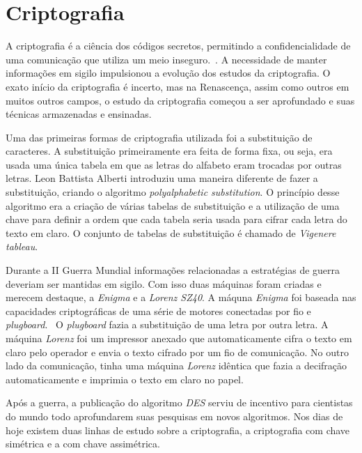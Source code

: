 \chapter{Criptografia}
\label{cryptograhy}

%
A criptografia é a ciência dos códigos secretos, permitindo a confidencialidade de uma comunicação que utiliza um meio inseguro.~\cite{vauldenay}. A necessidade de manter informações em sigilo impulsionou a evolução dos estudos da criptografia. O exato início da criptografia é incerto, mas na Renascença, assim como outros em muitos outros campos, o estudo da criptografia começou a ser aprofundado e suas técnicas armazenadas e ensinadas. \cite{donald-davies}

%
Uma das primeiras formas de criptografia utilizada foi a substituição de caracteres. A substituição primeiramente era feita de forma fixa, ou seja, era usada uma única tabela em que as letras do alfabeto eram trocadas por outras letras. Leon Battista Alberti introduziu uma maneira diferente de fazer a substituição, criando o algoritmo \textit{polyalphabetic substitution}. O princípio desse algoritmo era a criação de várias tabelas de substituição e a utilização de uma chave para definir a ordem que cada tabela seria usada para cifrar cada letra do texto em claro. O conjunto de tabelas de substituição é chamado de \textit{Vigenere tableau}.

%
Durante a II Guerra Mundial informações relacionadas a estratégias de guerra deveriam ser mantidas em sigilo. Com isso duas máquinas foram criadas e merecem destaque, a \textit{Enigma} e a \textit{Lorenz SZ40}. A máquna \textit{Enigma} foi baseada nas capacidades criptográficas de uma série de motores conectadas por fio e \textit{plugboard}.~\cite{jennifer-wilcox} O \textit{plugboard} fazia a substituição de uma letra por outra letra. A máquina \textit{Lorenz} foi um impressor anexado que automaticamente cifra o texto em claro pelo operador e envia o texto cifrado por um fio de comunicação. No outro lado da comunicação, tinha uma máquina \textit{Lorenz} idêntica que fazia a decifração automaticamente e imprimia o texto em claro no papel. ~\cite{chris-collins}

Após a guerra, a publicação do algoritmo \textit{DES} serviu de incentivo para cientistas do mundo todo aprofundarem suas pesquisas em novos algoritmos. Nos dias de hoje existem duas linhas de estudo sobre a criptografia, a criptografia com chave simétrica e a com chave assimétrica. 

